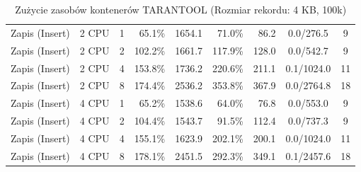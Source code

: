 \begin{table}[ht]
{\begin{tabular}{llcrrrrcc}
Zapis (Insert) & 2 CPU & 1 & 65.1\% & 1654.1 & 71.0\% & 86.2 & 0.0/276.5 & 9 \\
Zapis (Insert) & 2 CPU & 2 & 102.2\% & 1661.7 & 117.9\% & 128.0 & 0.0/542.7 & 9 \\
Zapis (Insert) & 2 CPU & 4 & 153.8\% & 1736.2 & 220.6\% & 211.1 & 0.1/1024.0 & 11 \\
Zapis (Insert) & 2 CPU & 8 & 174.4\% & 2536.2 & 353.8\% & 367.9 & 0.0/2764.8 & 18 \\
Zapis (Insert) & 4 CPU & 1 & 65.2\% & 1538.6 & 64.0\% & 76.8 & 0.0/553.0 & 9 \\
Zapis (Insert) & 4 CPU & 2 & 104.4\% & 1543.7 & 91.5\% & 112.4 & 0.0/737.3 & 9 \\
Zapis (Insert) & 4 CPU & 4 & 155.1\% & 1623.9 & 202.1\% & 200.1 & 0.0/1024.0 & 11 \\
Zapis (Insert) & 4 CPU & 8 & 178.1\% & 2451.5 & 292.3\% & 349.1 & 0.1/2457.6 & 18 \\
\bottomrule
\end{tabular}%
}
\caption{Zużycie zasobów kontenerów TARANTOOL (Rozmiar rekordu: 4 KB, 100k)}
\label{tab:resources_tarantool_medium_100000}
\end{table}
